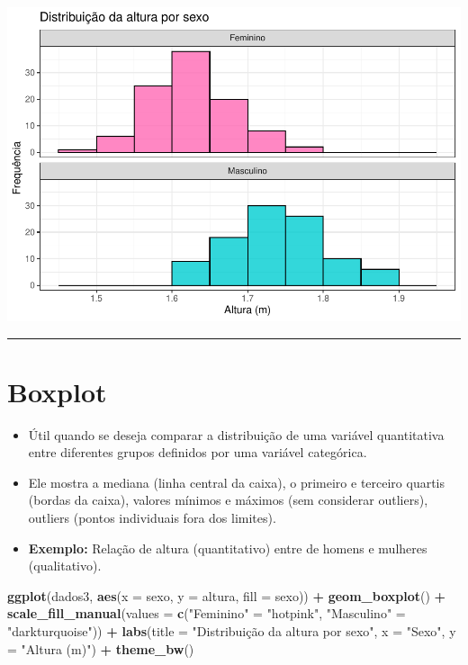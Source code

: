\documentclass[
]{book}
\newenvironment{Shaded}{\begin{snugshade}}{\end{snugshade}}
\newcommand{\AttributeTok}[1]{\textcolor[rgb]{0.13,0.29,0.53}{#1}}
\newcommand{\FunctionTok}[1]{\textcolor[rgb]{0.13,0.29,0.53}{\textbf{#1}}}
\newcommand{\NormalTok}[1]{#1}
\newcommand{\OtherTok}[1]{\textcolor[rgb]{0.56,0.35,0.01}{#1}}
\newcommand{\SpecialCharTok}[1]{\textcolor[rgb]{0.81,0.36,0.00}{\textbf{#1}}}
\newcommand{\StringTok}[1]{\textcolor[rgb]{0.31,0.60,0.02}{#1}}
\begin{document}
\begin{center}\includegraphics{AED_files/figure-latex/histograma2b-1} \end{center}

\begin{center}\rule{0.5\linewidth}{0.5pt}\end{center}

\section{Boxplot}\label{boxplot}

\begin{itemize}
\item
  Útil quando se deseja comparar a distribuição de uma variável quantitativa entre diferentes grupos definidos por uma variável categórica.
\item
  Ele mostra a mediana (linha central da caixa), o primeiro e terceiro quartis (bordas da caixa), valores mínimos e máximos (sem considerar outliers), outliers (pontos individuais fora dos limites).
\item
  \textbf{Exemplo:} Relação de altura (quantitativo) entre de homens e mulheres (qualitativo).
\end{itemize}

\begin{Shaded}
\begin{Highlighting}[]
\FunctionTok{ggplot}\NormalTok{(dados3, }\FunctionTok{aes}\NormalTok{(}\AttributeTok{x =}\NormalTok{ sexo, }\AttributeTok{y =}\NormalTok{ altura, }\AttributeTok{fill =}\NormalTok{ sexo)) }\SpecialCharTok{+}
  \FunctionTok{geom\_boxplot}\NormalTok{() }\SpecialCharTok{+}
  \FunctionTok{scale\_fill\_manual}\NormalTok{(}\AttributeTok{values =} \FunctionTok{c}\NormalTok{(}\StringTok{"Feminino"} \OtherTok{=} \StringTok{"hotpink"}\NormalTok{,  }
                               \StringTok{"Masculino"} \OtherTok{=} \StringTok{"darkturquoise"}\NormalTok{)) }\SpecialCharTok{+}
  \FunctionTok{labs}\NormalTok{(}\AttributeTok{title =} \StringTok{"Distribuição da altura por sexo"}\NormalTok{,}
       \AttributeTok{x =} \StringTok{"Sexo"}\NormalTok{, }\AttributeTok{y =} \StringTok{"Altura (m)"}\NormalTok{) }\SpecialCharTok{+}
  \FunctionTok{theme\_bw}\NormalTok{()}
\end{Highlighting}
\end{Shaded}
\end{document}

